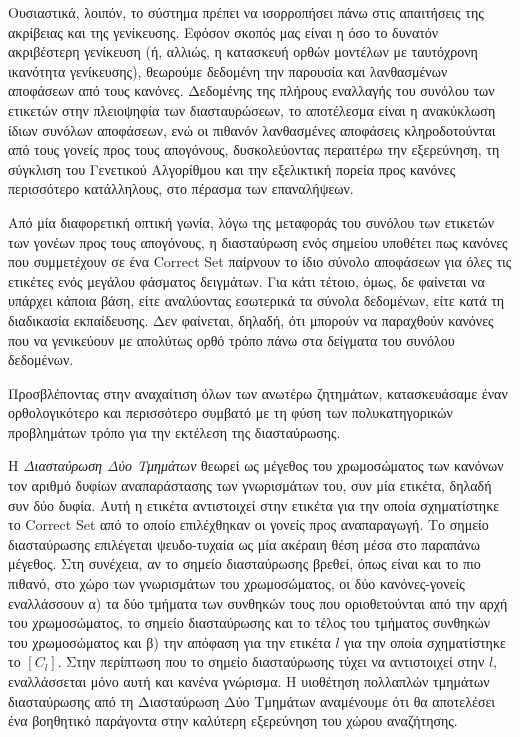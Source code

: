 Ουσιαστικά, λοιπόν, το σύστημα πρέπει να ισορροπήσει πάνω στις απαιτήσεις της ακρίβειας και της γενίκευσης. Εφόσον σκοπός μας είναι η όσο το δυνατόν ακριβέστερη γενίκευση (ή, αλλιώς, η κατασκευή ορθών μοντέλων με ταυτόχρονη ικανότητα γενίκευσης), θεωρούμε δεδομένη την παρουσία και λανθασμένων αποφάσεων από τους κανόνες. Δεδομένης της πλήρους εναλλαγής του συνόλου των ετικετών στην πλειοψηφία των διασταυρώσεων, το αποτέλεσμα είναι η ανακύκλωση ίδιων συνόλων αποφάσεων, ενώ οι πιθανόν λανθασμένες αποφάσεις κληροδοτούνται από τους γονείς προς τους απογόνους, δυσκολεύοντας περαιτέρω την εξερεύνηση, τη σύγκλιση του Γενετικού Αλγορίθμου και την εξελικτική πορεία προς κανόνες περισσότερο κατάλληλους, στο πέρασμα των επαναλήψεων.

Από μία διαφορετική οπτική γωνία, λόγω της μεταφοράς του συνόλου των ετικετών των γονέων προς τους απογόνους, η διασταύρωση ενός σημείου υποθέτει πως κανόνες που συμμετέχουν σε ένα Correct Set παίρνουν το ίδιο σύνολο αποφάσεων για όλες τις ετικέτες ενός μεγάλου φάσματος δειγμάτων. Για κάτι τέτοιο, όμως, δε φαίνεται να υπάρχει κάποια βάση, είτε αναλύοντας εσωτερικά τα σύνολα δεδομένων, είτε κατά τη διαδικασία εκπαίδευσης. Δεν φαίνεται, δηλαδή, ότι μπορούν να παραχθούν κανόνες που να γενικεύουν με απολύτως ορθό τρόπο πάνω στα δείγματα του συνόλου δεδομένων.

Προσβλέποντας στην αναχαίτιση όλων των ανωτέρω ζητημάτων, κατασκευάσαμε έναν ορθολογικότερο και περισσότερο συμβατό με τη φύση των πολυκατηγορικών προβλημάτων τρόπο για την εκτέλεση της διασταύρωσης. 

Η \emph{Διασταύρωση Δύο Τμημάτων} θεωρεί ως μέγεθος του χρωμοσώματος των κανόνων τον αριθμό δυφίων αναπαράστασης των γνωρισμάτων του, συν μία ετικέτα, δηλαδή συν δύο δυφία. Αυτή η ετικέτα αντιστοιχεί στην ετικέτα για την οποία σχηματίστηκε το Correct Set από το οποίο επιλέχθηκαν οι γονείς προς αναπαραγωγή. Το σημείο διασταύρωσης επιλέγεται ψευδο-τυχαία ως μία ακέραιη θέση μέσα στο παραπάνω μέγεθος. Στη συνέχεια, αν το σημείο διασταύρωσης βρεθεί, όπως είναι και το πιο πιθανό, στο χώρο των γνωρισμάτων του χρωμοσώματος, οι δύο κανόνες-γονείς εναλλάσσουν α) τα δύο τμήματα των συνθηκών τους που οριοθετούνται από την αρχή του χρωμοσώματος, το σημείο διασταύρωσης και το τέλος του τμήματος συνθηκών του χρωμοσώματος και β) την απόφαση για την ετικέτα $l$ για την οποία σχηματίστηκε το $[C_{l}]$. Στην περίπτωση που το σημείο διασταύρωσης τύχει να αντιστοιχεί στην $l$, εναλλάσσεται μόνο αυτή και κανένα γνώρισμα. Η υιοθέτηση πολλαπλών τμημάτων διασταύρωσης από τη Διασταύρωση Δύο Τμημάτων αναμένουμε ότι θα αποτελέσει ένα βοηθητικό παράγοντα στην καλύτερη εξερεύνηση του χώρου αναζήτησης.

